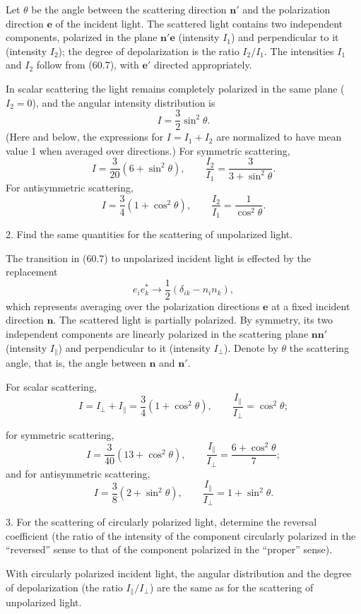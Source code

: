 \SolutionHeading Let $\theta$ be the angle between the scattering direction $\mathbf n'$ and the polarization direction $\mathbf e$ of the incident light. The scattered light contains two independent components, polarized in the plane $\mathbf n'\mathbf e$ (intensity $I_1$) and perpendicular to it (intensity $I_2$); the degree of depolarization is the ratio $I_2/I_1$. The intensities $I_1$ and $I_2$ follow from (60.7), with $\mathbf e'$ directed appropriately.

In scalar scattering the light remains completely polarized in the same plane ($I_2=0$), and the angular intensity distribution is
\[
I=\frac32\sin^2\theta.
\]
(Here and below, the expressions for $I=I_1+I_2$ are normalized to have mean value 1 when averaged over directions.) For symmetric scattering,
\[
I=\frac3{20}(6+\sin^2\theta),
\qquad \frac{I_2}{I_1}=\frac3{3+\sin^2\theta}.
\]
For antisymmetric scattering,
\[
I=\frac34(1+\cos^2\theta),
\qquad \frac{I_2}{I_1}=\frac1{\cos^2\theta}.
\]

2. Find the same quantities for the scattering of unpolarized light.

\SolutionHeading The transition in (60.7) to unpolarized incident light is effected by the replacement
\[
e_i e_k^*\longrightarrow\frac12(\delta_{ik}-n_i n_k),
\]
which represents averaging over the polarization directions $\mathbf e$ at a fixed incident direction $\mathbf n$. The scattered light is partially polarized. By symmetry, its two independent components are linearly polarized in the scattering plane $\mathbf n\mathbf n'$ (intensity $I_{\parallel}$) and perpendicular to it (intensity $I_{\perp}$). Denote by $\theta$ the scattering angle, that is, the angle between $\mathbf n$ and $\mathbf n'$.

For scalar scattering,
\[
I=I_{\perp}+I_{\parallel}=\frac34(1+\cos^2\theta),
\qquad \frac{I_{\parallel}}{I_{\perp}}=\cos^2\theta;
\]

for symmetric scattering,
\[
I=\frac3{40}(13+\cos^2\theta),
\qquad \frac{I_{\parallel}}{I_{\perp}}=\frac{6+\cos^2\theta}{7};
\]
and for antisymmetric scattering,
\[
I=\frac38(2+\sin^2\theta),
\qquad \frac{I_{\parallel}}{I_{\perp}}=1+\sin^2\theta.
\]

3. For the scattering of circularly polarized light, determine the reversal coefficient (the ratio of the intensity of the component circularly polarized in the ``reversed'' sense to that of the component polarized in the ``proper'' sense).

\SolutionHeading With circularly polarized incident light, the angular distribution and the degree of depolarization (the ratio $I_{\parallel}/I_{\perp}$) are the same as for the scattering of unpolarized light.

